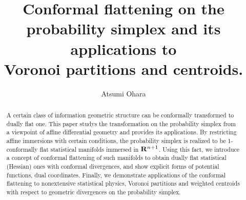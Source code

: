 \documentclass{llncs}
\renewcommand{\today}{\number\month / \number\day / \number\year}
\begin{document}
\title{Conformal flattening on the probability simplex and 
its applications to \\ 
Voronoi partitions and centroids.}
%

\author{Atsumi Ohara}
%



\maketitle              %
\begin{abstract}
A certain class of information geometric structure can be 
conformally transformed to dually flat one.
This paper studys the transformation on the probability simplex
from a viewpoint of affine differential geometry \cite{NS} and provides 
its applications.
By restricting affine immersions with certain conditions,
the probability simplex is realized to be 1-conformally flat \cite{Kurose94} 
statistical manifolds immersed in ${\bf R}^{n+1}$.
Using this fact, we introduce a concept of conformal flattening of such
manifolds to obtain dually flat statistical (Hessian) ones with conformal
divergences,
and show explicit forms of potential functions, dual coordinates.
Finally, we demonstrate applications of the conformal flattening to
nonextensive statistical physics, Voronoi partitions and weighted centroids 
with respect to geometric divergences on the probability simplex.
\end{abstract}  
\end{document}
